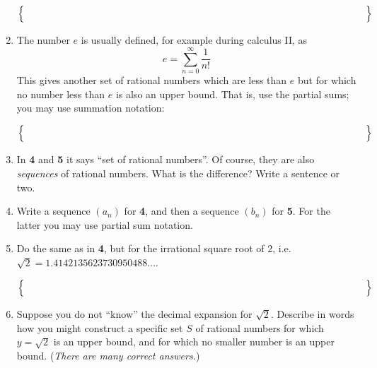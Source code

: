 \documentclass[11pt]{amsart}
\begin{document}
\begin{enumerate}[leftmargin=-1mm]
$$\Big\{ \hspace{5.0in} \Big\}$$
\vfill
\item The number $e$ is usually defined, for example during calculus II, as
	$$e = \sum_{n=0}^\infty \frac{1}{n!}$$
This gives another set of rational numbers which are less than $e$ but for which no number less than $e$ is also an upper bound.  That is, use the partial sums; you may use summation notation:

$$\Big\{ \hspace{5.0in} \Big\}$$
\vfill
\clearpage\newpage
\item In \textbf{4} and \textbf{5} it says ``set of rational numbers''.  Of course, they are also \emph{sequences} of rational numbers.  What is the difference?  Write a sentence or two.

\vspace{1.0in}
\item Write a sequence $(a_n)$ for \textbf{4}, and then a sequence $(b_n)$ for \textbf{5}.  For the latter you may use partial sum notation.
\vfill
\item Do the same as in \textbf{4}, but for the irrational square root of $2$, i.e.~$\sqrt{2} = 1.4142135623730950488\dots$.

$$\Big\{ \hspace{5.0in} \Big\}$$

\bigskip
\item Suppose you do not ``know'' the decimal expansion for $\sqrt{2}$.  Describe in words how you might construct a specific set $S$ of rational numbers for which $y=\sqrt{2}$ is an upper bound, and for which no smaller number is an upper bound.  (\emph{There are many correct answers.})
\vfill
\end{enumerate}
\end{document}
